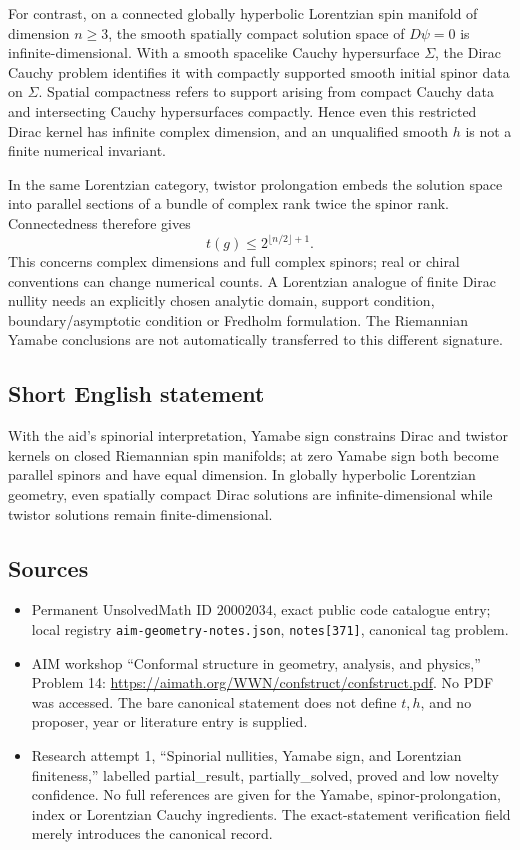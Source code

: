 \documentclass[11pt]{article}
\begin{document}
For contrast, on a connected globally hyperbolic Lorentzian spin manifold of dimension \(n\geq3\), the smooth spatially compact solution space of \(D\psi=0\) is infinite-dimensional. With a smooth spacelike Cauchy hypersurface \(\Sigma\), the Dirac Cauchy problem identifies it with compactly supported smooth initial spinor data on \(\Sigma\). Spatial compactness refers to support arising from compact Cauchy data and intersecting Cauchy hypersurfaces compactly. Hence even this restricted Dirac kernel has infinite complex dimension, and an unqualified smooth \(h\) is not a finite numerical invariant.

In the same Lorentzian category, twistor prolongation embeds the solution space into parallel sections of a bundle of complex rank twice the spinor rank. Connectedness therefore gives
\[
 t(g)\leq2^{\lfloor n/2\rfloor+1}.
\]
This concerns complex dimensions and full complex spinors; real or chiral conventions can change numerical counts. A Lorentzian analogue of finite Dirac nullity needs an explicitly chosen analytic domain, support condition, boundary/asymptotic condition or Fredholm formulation. The Riemannian Yamabe conclusions are not automatically transferred to this different signature.
\subsection{Short English statement}
With the aid's spinorial interpretation, Yamabe sign constrains Dirac and twistor kernels on closed Riemannian spin manifolds; at zero Yamabe sign both become parallel spinors and have equal dimension. In globally hyperbolic Lorentzian geometry, even spatially compact Dirac solutions are infinite-dimensional while twistor solutions remain finite-dimensional.
\subsection{Sources}
\begin{itemize}
\item Permanent UnsolvedMath ID \(20002034\), exact public code catalogue entry; local registry \texttt{aim-geometry-notes.json}, \texttt{notes[371]}, canonical tag problem.
\item AIM workshop ``Conformal structure in geometry, analysis, and physics,'' Problem 14: \url{https://aimath.org/WWN/confstruct/confstruct.pdf}. No PDF was accessed. The bare canonical statement does not define \(t,h\), and no proposer, year or literature entry is supplied.
\item Research attempt 1, ``Spinorial nullities, Yamabe sign, and Lorentzian finiteness,'' labelled partial\_result, partially\_solved, proved and low novelty confidence. No full references are given for the Yamabe, spinor-prolongation, index or Lorentzian Cauchy ingredients. The exact-statement verification field merely introduces the canonical record.
\end{itemize}
\end{document}
